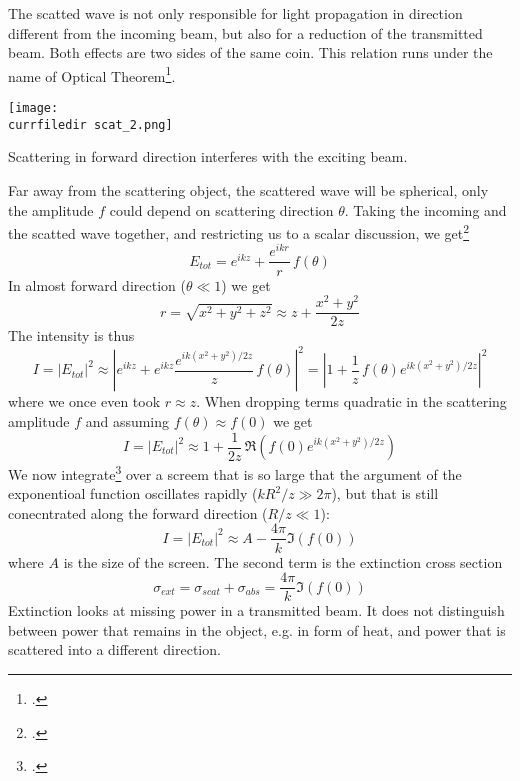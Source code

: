 The scatted wave is not only responsible for light propagation in direction different from the incoming beam, but also for a reduction of the transmitted beam. Both effects are two sides of the same coin. This relation runs under the name of Optical Theorem\footcite{Newton:1976cz}.

\begin{marginfigure}
   \texttt{[image: \\currfiledir scat\_2.png]}
  \caption{Scattering in forward direction interferes with the exciting beam.}
\end{marginfigure}

Far away from the scattering object, the scattered wave will be spherical, only the amplitude $f$ could depend on scattering direction $\theta$. Taking the incoming and the scatted wave together, and restricting us to a scalar discussion, we get\footcite{Newton:1976cz}
\begin{equation}
 E_{tot} =  e^{i k z} + \frac{e^{i k r}}{r} \, f(\theta)
\end{equation}
In almost forward direction ($\theta \ll 1$) we get
\begin{equation}
r = \sqrt{x^2 + y^2 + z^2} \approx z + \frac{x^2 + y^2}{2z }
\end{equation}
The intensity is thus
\begin{equation}
 I = |E_{tot}|^2 \approx \left|e^{i k z} + e^{i k z} \frac{e^{i k (x^2 + y^2)/2z }}{z} \, f(\theta) \right| ^2 = \left|1 + \frac{1}{z} \, f(\theta) e^{i k (x^2 + y^2)/2z } \right| ^2
\end{equation}
where we once even took $r \approx z$. When dropping terms quadratic in the scattering amplitude $f$ and assuming $f(\theta) \approx f(0)$ we get
\begin{equation}
 I = |E_{tot}|^2 \approx 1 +   \frac{1}{2 z} \, \Re  \left( f(0) e^{i k (x^2 + y^2)/2z } \right)
\end{equation}
We now integrate\footcite{Newton:1976cz} over a screem that is so large that the argument of the exponentioal function oscillates rapidly ($k R^2 / z \gg 2 \pi$), but that is still conecntrated along the forward direction ($R/z \ll 1$):
\begin{equation}
 I = |E_{tot}|^2 \approx A  - \frac{4 \pi }{k} \Im ( f(0) )
\end{equation}
where $A$ is the size of the screen. The second term is the extinction cross section
\begin{equation}
 \sigma_{ext} = \sigma_{scat}  + \sigma_{abs}  = \frac{4 \pi }{k} \Im ( f(0) )
\end{equation}
Extinction looks at missing power in a transmitted beam. It does not distinguish between power that remains in the object, e.g. in form of heat, and power that is scattered into a different direction.


